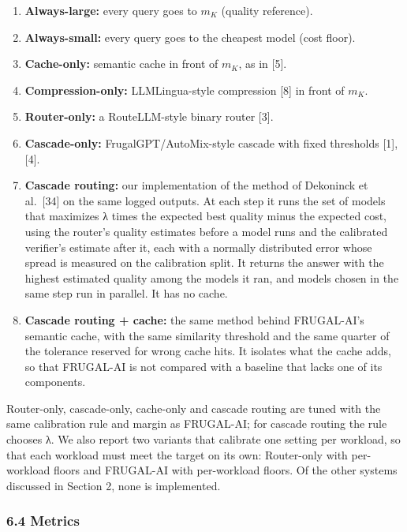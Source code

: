 \documentclass[
  10pt,
]{article}
\newcounter{none} %
\providecommand{\tightlist}{%
  \setlength{\itemsep}{0pt}\setlength{\parskip}{0pt}}
\begin{document}
\begin{enumerate}
\def\labelenumi{\arabic{enumi}.}
\tightlist
\item
  \textbf{Always-large:} every query goes to \(m_K\) (quality
  reference).
\item
  \textbf{Always-small:} every query goes to the cheapest model (cost
  floor).
\item
  \textbf{Cache-only:} semantic cache in front of \(m_K\), as in
  {[}5{]}.
\item
  \textbf{Compression-only:} LLMLingua-style compression {[}8{]} in
  front of \(m_K\).
\item
  \textbf{Router-only:} a RouteLLM-style binary router {[}3{]}.
\item
  \textbf{Cascade-only:} FrugalGPT/AutoMix-style cascade with fixed
  thresholds {[}1{]}, {[}4{]}.
\item
  \textbf{Cascade routing:} our implementation of the method of
  Dekoninck et al.~{[}34{]} on the same logged outputs. At each step it
  runs the set of models that maximizes λ times the expected best
  quality minus the expected cost, using the router's quality estimates
  before a model runs and the calibrated verifier's estimate after it,
  each with a normally distributed error whose spread is measured on the
  calibration split. It returns the answer with the highest estimated
  quality among the models it ran, and models chosen in the same step
  run in parallel. It has no cache.
\item
  \textbf{Cascade routing + cache:} the same method behind FRUGAL-AI's
  semantic cache, with the same similarity threshold and the same
  quarter of the tolerance reserved for wrong cache hits. It isolates
  what the cache adds, so that FRUGAL-AI is not compared with a baseline
  that lacks one of its components.
\end{enumerate}

Router-only, cascade-only, cache-only and cascade routing are tuned with
the same calibration rule and margin as FRUGAL-AI; for cascade routing
the rule chooses λ. We also report two variants that calibrate one
setting per workload, so that each workload must meet the target on its
own: Router-only with per-workload floors and FRUGAL-AI with
per-workload floors. Of the other systems discussed in Section 2, none
is implemented.

\subsubsection{6.4 Metrics}\label{metrics}
\end{document}
